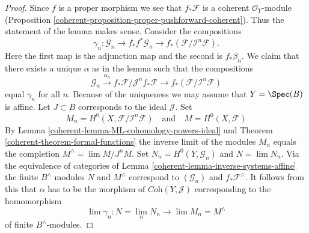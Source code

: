 \begin{proof}

Since $f$ is a proper morphism we see that $f_*\mathcal{F}$
is a coherent $\mathcal{O}_Y$-module
(Proposition \ref{coherent-proposition-proper-pushforward-coherent}).
Thus the statement of the lemma makes sense.
Consider the compositions
$$
\gamma_n : \mathcal{G}_n \to
f_*f^*\mathcal{G}_n \to
f_*(\mathcal{F}/\mathcal{I}^n\mathcal{F}).
$$
Here the first map is the adjunction map and the second is $f_*\beta_n$.
We claim that there exists a unique $\alpha$ as in the lemma
such that the compositions
$$
\mathcal{G}_n \xrightarrow{\alpha_n}
f_*\mathcal{F}/\mathcal{J}^nf_*\mathcal{F} \to
f_*(\mathcal{F}/\mathcal{I}^n\mathcal{F})
$$
equal $\gamma_n$ for all $n$. Because of the uniqueness we may assume
that $Y = \Spec(B)$ is affine. Let $J \subset B$ corresponds to the
ideal $\mathcal{J}$. Set
$$
M_n = H^0(X, \mathcal{F}/\mathcal{I}^n\mathcal{F})
\quad\text{and}\quad
M = H^0(X, \mathcal{F})
$$
By Lemma \ref{coherent-lemma-ML-cohomology-powers-ideal} and
Theorem \ref{coherent-theorem-formal-functions}
the inverse limit of the modules
$M_n$ equals the completion $M^\wedge = \lim M/J^nM$.
Set $N_n = H^0(Y, \mathcal{G}_n)$ and $N = \lim N_n$.
Via the equivalence of categories of
Lemma \ref{coherent-lemma-inverse-systems-affine}
the finite $B^\wedge$ modules $N$ and $M^\wedge$ correspond
to $(\mathcal{G}_n)$ and $f_*\mathcal{F}^\wedge$.
It follows from this that $\alpha$ has to be the morphism of
$\textit{Coh}(Y, \mathcal{J})$ corresponding to the homomorphism
$$
\lim \gamma_n : N = \lim_n N_n \longrightarrow \lim M_n = M^\wedge
$$
of finite $B^\wedge$-modules.


\end{proof}
